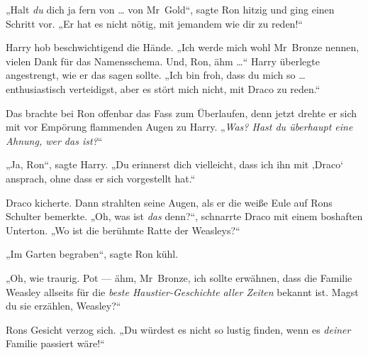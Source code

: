 „Halt \emph{du} dich ja fern von … von Mr~Gold“, sagte Ron hitzig und ging einen Schritt vor.
„Er hat es nicht nötig, mit jemandem wie dir zu reden!“

Harry hob beschwichtigend die Hände.
„Ich werde mich wohl Mr~Bronze nennen, vielen Dank für das Namensschema. Und, Ron, ähm …“ Harry überlegte angestrengt, wie er das sagen sollte.
„Ich bin froh, dass du mich so … enthusiastisch verteidigst, aber es stört mich nicht, mit Draco zu reden.“

Das brachte bei Ron offenbar das Fass zum Überlaufen, denn jetzt drehte er sich mit vor Empörung flammenden Augen zu Harry.
„\emph{Was? Hast du überhaupt eine \emph{Ahnung}, wer das ist?}“

„Ja, Ron“, sagte Harry.
„Du erinnerst dich vielleicht, dass ich ihn mit ‚Draco‘ ansprach, ohne dass er sich vorgestellt hat.“

Draco kicherte. Dann strahlten seine Augen, als er die weiße Eule auf Rons Schulter bemerkte.
„Oh, was ist \emph{das} denn?“, schnarrte Draco mit einem boshaften Unterton.
„Wo ist die berühmte Ratte der Weasleys?“

„Im Garten begraben“, sagte Ron kühl.

„Oh, wie traurig. Pot — ähm, Mr~Bronze, ich sollte erwähnen, dass die Familie Weasley allseits für die \emph{beste Haustier-Geschichte aller Zeiten} bekannt ist. Magst du sie erzählen, Weasley?“

Rons Gesicht verzog sich.
„Du würdest es nicht so lustig finden, wenn es \emph{deiner} Familie passiert wäre!“

